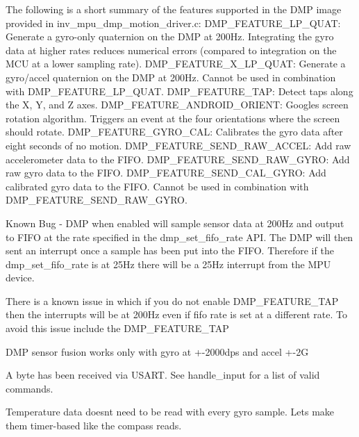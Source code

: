 The following is a short summary of the features supported in the D\+MP image provided in inv\+\_\+mpu\+\_\+dmp\+\_\+motion\+\_\+driver.\+c\+: D\+M\+P\+\_\+\+F\+E\+A\+T\+U\+R\+E\+\_\+\+L\+P\+\_\+\+Q\+U\+AT\+: Generate a gyro-\/only quaternion on the D\+MP at 200\+Hz. Integrating the gyro data at higher rates reduces numerical errors (compared to integration on the M\+CU at a lower sampling rate). D\+M\+P\+\_\+\+F\+E\+A\+T\+U\+R\+E\+\_\+X\+\_\+\+L\+P\+\_\+\+Q\+U\+AT\+: Generate a gyro/accel quaternion on the D\+MP at 200\+Hz. Cannot be used in combination with D\+M\+P\+\_\+\+F\+E\+A\+T\+U\+R\+E\+\_\+\+L\+P\+\_\+\+Q\+U\+AT. D\+M\+P\+\_\+\+F\+E\+A\+T\+U\+R\+E\+\_\+\+T\+AP\+: Detect taps along the X, Y, and Z axes. D\+M\+P\+\_\+\+F\+E\+A\+T\+U\+R\+E\+\_\+\+A\+N\+D\+R\+O\+I\+D\+\_\+\+O\+R\+I\+E\+NT\+: Google\textquotesingle{}s screen rotation algorithm. Triggers an event at the four orientations where the screen should rotate. D\+M\+P\+\_\+\+F\+E\+A\+T\+U\+R\+E\+\_\+\+G\+Y\+R\+O\+\_\+\+C\+AL\+: Calibrates the gyro data after eight seconds of no motion. D\+M\+P\+\_\+\+F\+E\+A\+T\+U\+R\+E\+\_\+\+S\+E\+N\+D\+\_\+\+R\+A\+W\+\_\+\+A\+C\+C\+EL\+: Add raw accelerometer data to the F\+I\+FO. D\+M\+P\+\_\+\+F\+E\+A\+T\+U\+R\+E\+\_\+\+S\+E\+N\+D\+\_\+\+R\+A\+W\+\_\+\+G\+Y\+RO\+: Add raw gyro data to the F\+I\+FO. D\+M\+P\+\_\+\+F\+E\+A\+T\+U\+R\+E\+\_\+\+S\+E\+N\+D\+\_\+\+C\+A\+L\+\_\+\+G\+Y\+RO\+: Add calibrated gyro data to the F\+I\+FO. Cannot be used in combination with D\+M\+P\+\_\+\+F\+E\+A\+T\+U\+R\+E\+\_\+\+S\+E\+N\+D\+\_\+\+R\+A\+W\+\_\+\+G\+Y\+RO.

Known Bug -\/ D\+MP when enabled will sample sensor data at 200\+Hz and output to F\+I\+FO at the rate specified in the dmp\+\_\+set\+\_\+fifo\+\_\+rate A\+PI. The D\+MP will then sent an interrupt once a sample has been put into the F\+I\+FO. Therefore if the dmp\+\_\+set\+\_\+fifo\+\_\+rate is at 25\+Hz there will be a 25\+Hz interrupt from the M\+PU device.

There is a known issue in which if you do not enable D\+M\+P\+\_\+\+F\+E\+A\+T\+U\+R\+E\+\_\+\+T\+AP then the interrupts will be at 200\+Hz even if fifo rate is set at a different rate. To avoid this issue include the D\+M\+P\+\_\+\+F\+E\+A\+T\+U\+R\+E\+\_\+\+T\+AP

D\+MP sensor fusion works only with gyro at +-\/2000dps and accel +-\/2G

A byte has been received via U\+S\+A\+RT. See handle\+\_\+input for a list of valid commands.

Temperature data doesn\textquotesingle{}t need to be read with every gyro sample. Let\textquotesingle{}s make them timer-\/based like the compass reads.

